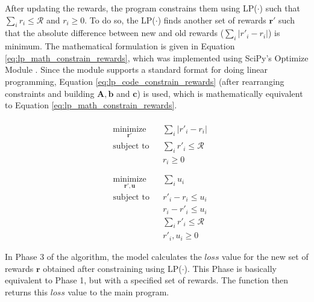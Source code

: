 \documentclass[12pt]{article}
\newcommand{\vect}[1]{\mathbf{#1}}  %
\newcommand{\matr}[1]{\mathbf{#1}}  %
\begin{document}
    After updating the rewards, the program constrains them using LP($\cdot$) such that $\sum_{i}r_i \leq \mathcal{R}$ and $r_i \geq 0$. To do so, the LP($\cdot$) finds another set of rewards $\vect{r'}$ such that the absolute difference between new and old rewards ($\sum_{i}|r'_i - r_i|$) is minimum. The mathematical formulation is given in Equation \ref{eq:lp_math_constrain_rewards}, which was implemented using SciPy's Optimize Module \cite{SCPOptimizeDocs}. Since the module supports a standard format for doing linear programming, Equation \ref{eq:lp_code_constrain_rewards} (after rearranging constraints and building $\matr{A}, \vect{b}$ and $\vect{c}$) is used, which is mathematically equivalent to Equation \ref{eq:lp_math_constrain_rewards}.
    \begin{multicols}{2}
        \begin{equation} \label{eq:lp_math_constrain_rewards}
            \begin{aligned}\\
                & \underset{\vect{r'}}{\text{minimize}}
                & & \sum_{i}|r'_i - r_i|\\
                & \text{subject to}
                & & \sum_{i}r'_i \leq \mathcal{R}\\
                &&& r_i \geq 0\\ \\
            \end{aligned}
        \end{equation}\break
        \begin{equation} \label{eq:lp_code_constrain_rewards}
            \begin{aligned}
                & \underset{\vect{r'}, \vect{u}}{\text{minimize}}
                & & \sum_{i} u_i\\
                & \text{subject to}
                & & r'_i - r_i \leq u_i\\
                &&& r_i - r'_i \leq u_i\\
                &&& \sum_{i} r'_i \leq \mathcal{R}\\
                &&& r'_i, u_i \geq 0
            \end{aligned}
        \end{equation}
    \end{multicols}

    In Phase 3 of the algorithm, the model calculates the $loss$ value for the new set of rewards $\vect{r}$ obtained after constraining using LP($\cdot$). This Phase is basically equivalent to Phase 1, but with a specified set of rewards. The function then returns this $loss$ value to the main program.
    
\end{document}
